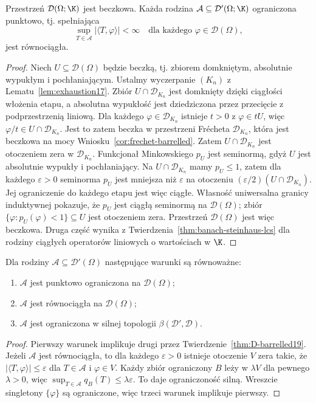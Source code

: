 \begin{twierdzenie}
\label{thm:D-barrelled19}
Przestrzeń $\mathcal D(\Omega;\K)$ jest beczkowa.
Każda rodzina $\mathcal A\subseteq\mathcal D'(\Omega;\K)$
ograniczona punktowo, tj. spełniająca
\[\sup_{T\in\mathcal A}|\langle T,\varphi\rangle|<\infty
\quad\text{dla każdego }\varphi\in\mathcal D(\Omega),\]
jest równociągła.
\end{twierdzenie}
\begin{proof}
Niech $U\subseteq\mathcal D(\Omega)$ będzie
beczką, tj. zbiorem domkniętym, absolutnie wypukłym
i pochłaniającym. Ustalmy wyczerpanie $(K_n)$ z Lematu~\ref{lem:exhaustion17}.
Zbiór $U\cap\mathcal D_{K_n}$ jest domknięty dzięki ciągłości
włożenia etapu, a absolutna wypukłość jest dziedziczona
przez przecięcie z podprzestrzenią liniową. Dla każdego
$\varphi\in\mathcal D_{K_n}$ istnieje $t>0$ z $\varphi\in tU$,
więc $\varphi/t\in U\cap\mathcal D_{K_n}$.
Jest to zatem beczka w przestrzeni Frécheta $\mathcal D_{K_n}$,
która jest beczkowa na mocy Wniosku~\ref{cor:frechet-barrelled}. Zatem
$U\cap\mathcal D_{K_n}$ jest otoczeniem zera
w $\mathcal D_{K_n}$.
Funkcjonał Minkowskiego $p_U$ jest seminormą, gdyż $U$
jest absolutnie wypukły i pochłaniający.
Na $U\cap\mathcal D_{K_n}$ mamy $p_U\le1$, zatem dla
każdego $\varepsilon>0$ seminorma $p_U$ jest mniejsza niż
$\varepsilon$ na otoczeniu $(\varepsilon/2)(U\cap\mathcal D_{K_n})$.
Jej ograniczenie do każdego etapu jest więc ciągłe. Własność uniwersalna
granicy induktywnej pokazuje, że $p_U$ jest ciągłą
seminormą na $\mathcal D(\Omega)$; zbiór
$\{\varphi:p_U(\varphi)<1\}\subseteq U$ jest otoczeniem
zera. Przestrzeń $\mathcal D(\Omega)$ jest więc beczkowa.
Druga część wynika z Twierdzenia~\ref{thm:banach-steinhaus-lcs}
dla rodziny ciągłych operatorów liniowych o wartościach w $\K$.
\end{proof}

\begin{wniosek}
\label{cor:bounded-distributions19}
Dla rodziny $\mathcal A\subseteq\mathcal D'(\Omega)$
następujące warunki są równoważne:
\begin{enumerate}
\item $\mathcal A$ jest punktowo ograniczona na $\mathcal D(\Omega)$;
\item $\mathcal A$ jest równociągła na $\mathcal D(\Omega)$;
\item $\mathcal A$ jest ograniczona w silnej topologii
$\beta(\mathcal D',\mathcal D)$.
\end{enumerate}
\end{wniosek}
\begin{proof}
Pierwszy warunek implikuje drugi przez
Twierdzenie~\ref{thm:D-barrelled19}. Jeżeli
$\mathcal A$ jest równociągła, to dla każdego
$\varepsilon>0$ istnieje otoczenie $V$ zera takie,
że $|\langle T,\varphi\rangle|\le\varepsilon$ dla
$T\in\mathcal A$ i $\varphi\in V$.
Każdy zbiór ograniczony $B$ leży w $\lambda V$
dla pewnego $\lambda>0$, więc
$\sup_{T\in\mathcal A}q_B(T)\le\lambda\varepsilon$.
To daje ograniczoność silną. Wreszcie singletony
$\{\varphi\}$ są ograniczone, więc trzeci warunek
implikuje pierwszy.
\end{proof}

